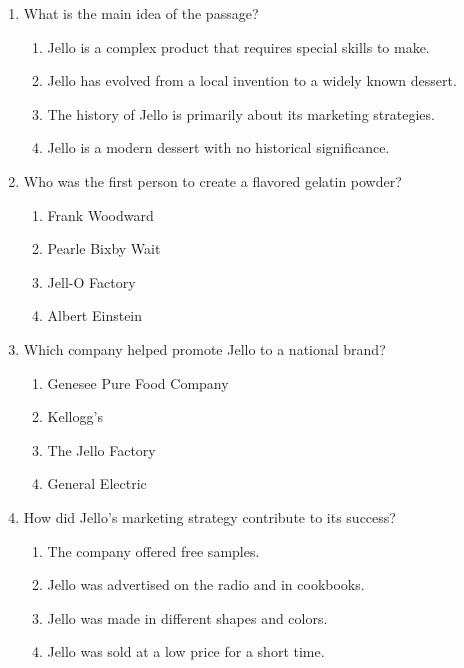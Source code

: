 \documentclass[12pt]{article}
\begin{document}
\begin{enumerate}

\item What is the main idea of the passage?
\begin{enumerate}[label=\Alph*.]
    \item Jello is a complex product that requires special skills to make.
    \item Jello has evolved from a local invention to a widely known dessert.
    \item The history of Jello is primarily about its marketing strategies.
    \item Jello is a modern dessert with no historical significance.
\end{enumerate}

\vspace{0.5cm}

\item Who was the first person to create a flavored gelatin powder?
\begin{enumerate}[label=\Alph*.]
    \item Frank Woodward
    \item Pearle Bixby Wait
    \item Jell-O Factory
    \item Albert Einstein
\end{enumerate}

\vspace{0.5cm}

\item Which company helped promote Jello to a national brand?
\begin{enumerate}[label=\Alph*.]
    \item Genesee Pure Food Company
    \item Kellogg's
    \item The Jello Factory
    \item General Electric
\end{enumerate}

\vspace{0.5cm}

\item How did Jello’s marketing strategy contribute to its success?
\begin{enumerate}[label=\Alph*.]
    \item The company offered free samples.
    \item Jello was advertised on the radio and in cookbooks.
    \item Jello was made in different shapes and colors.
    \item Jello was sold at a low price for a short time.
\end{enumerate}


\end{enumerate}
\end{document}
